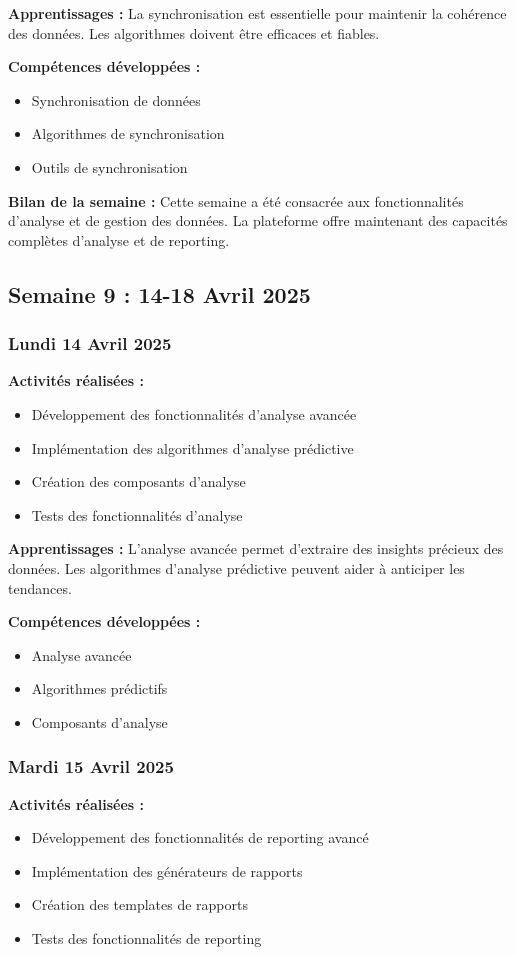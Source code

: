 \documentclass[12pt,a4paper]{article}
\begin{document}
\textbf{Apprentissages :}
La synchronisation est essentielle pour maintenir la cohérence des données. Les algorithmes doivent être efficaces et fiables.

\textbf{Compétences développées :}
\begin{itemize}
    \item Synchronisation de données
    \item Algorithmes de synchronisation
    \item Outils de synchronisation
\end{itemize}

\textbf{Bilan de la semaine :}
Cette semaine a été consacrée aux fonctionnalités d'analyse et de gestion des données. La plateforme offre maintenant des capacités complètes d'analyse et de reporting.

\clearpage
\subsection{Semaine 9 : 14-18 Avril 2025}

\subsubsection{Lundi 14 Avril 2025}
\textbf{Activités réalisées :}
\begin{itemize}
    \item Développement des fonctionnalités d'analyse avancée
    \item Implémentation des algorithmes d'analyse prédictive
    \item Création des composants d'analyse
    \item Tests des fonctionnalités d'analyse
\end{itemize}

\textbf{Apprentissages :}
L'analyse avancée permet d'extraire des insights précieux des données. Les algorithmes d'analyse prédictive peuvent aider à anticiper les tendances.

\textbf{Compétences développées :}
\begin{itemize}
    \item Analyse avancée
    \item Algorithmes prédictifs
    \item Composants d'analyse
\end{itemize}

\subsubsection{Mardi 15 Avril 2025}
\textbf{Activités réalisées :}
\begin{itemize}
    \item Développement des fonctionnalités de reporting avancé
    \item Implémentation des générateurs de rapports
    \item Création des templates de rapports
    \item Tests des fonctionnalités de reporting
\end{itemize}
\end{document}
